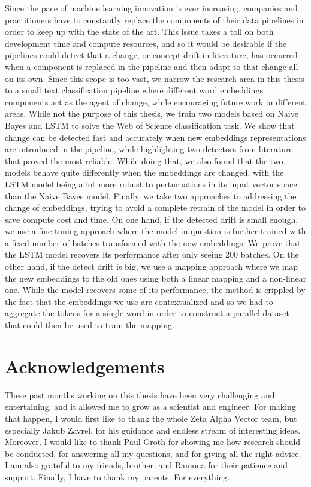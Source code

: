 \documentclass[12pt]{extreport}
\begin{document}
Since the pace of machine learning innovation is ever increasing, companies and practitioners have to constantly replace the components of their data pipelines in order to keep up with the state of the art. This issue takes a toll on both development time and compute resources, and so it would be desirable if the pipelines could detect that a change, or concept drift in literature, has occurred when a component is replaced in the pipeline and then adapt to that change all on its own. Since this scope is too vast, we narrow the research area in this thesis to a small text classification pipeline where different word embeddings components act as the agent of change, while encouraging future work in different areas. While not the purpose of this thesis, we train two models based on Naive Bayes and LSTM to solve the Web of Science classification task. We show that change can be detected fast and accurately when new embeddings representations are introduced in the pipeline, while highlighting two detectors from literature that proved the most reliable. While doing that, we also found that the two models behave quite differently when the embeddings are changed, with the LSTM model being a lot more robust to perturbations in its input vector space than the Naive Bayes model. Finally, we take two approaches to addressing the change of embeddings, trying to avoid a complete retrain of the model in order to save compute cost and time. On one hand, if the detected drift is small enough, we use a fine-tuning approach where the model in question is further trained with a fixed number of batches transformed with the new embeddings. We prove that the LSTM model recovers its performance after only seeing 200 batches. On the other hand, if the detect drift is big, we use a mapping approach where we map the new embeddings to the old ones using both a linear mapping and a non-linear one. While the model recovers some of its performance, the method is crippled by the fact that the embeddings we use are contextualized and so we had to aggregate the tokens for a single word in order to construct a parallel dataset that could then be used to train the mapping.

\chapter*{Acknowledgements}

These past months working on this thesis have been very challenging and entertaining, and it allowed me to grow as a scientist and engineer. For making that happen, I would first like to thank the whole Zeta Alpha Vector team, but especially Jakub Zavrel, for his guidance and endless stream of interesting ideas. Moreover, I would like to thank Paul Groth for showing me how research should be conducted, for answering all my questions, and for giving all the right advice. I am also grateful to my friends, brother, and Ramona for their patience and support. Finally, I have to thank my parents. For everything.
\end{document}
